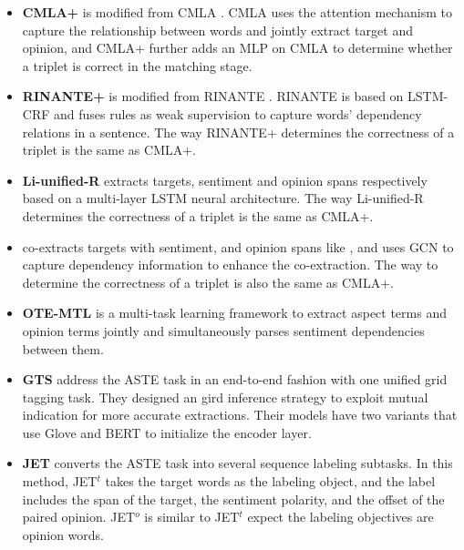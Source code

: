 \documentclass[11pt]{article}
\begin{document}
\begin{itemize}

     \item \textbf{CMLA+} is modified from CMLA \cite{wang2017coupled}. 
     CMLA uses the attention mechanism to capture the relationship between words and jointly extract target and opinion, and CMLA+ further adds an MLP on CMLA to determine whether a triplet is correct in the matching stage.
     
     \item \textbf{RINANTE+} is modified from RINANTE \cite{dai2019neural}. RINANTE is based on LSTM-CRF and fuses rules as weak supervision to capture words' dependency relations in a sentence. The way RINANTE+ determines the correctness of a triplet is the same as CMLA+.
     
     \item \textbf{Li-unified-R}  \cite{li2019unified} extracts targets, sentiment and opinion spans respectively based on a multi-layer LSTM neural architecture. 
     The way Li-unified-R determines the correctness of a triplet is the same as CMLA+.
     
     \item {} co-extracts targets with sentiment, and opinion spans like \cite{li2019unified}, and uses GCN to capture dependency information to enhance the co-extraction. The way to determine the correctness of a triplet is also the same as CMLA+.
     
     \item \textbf{OTE-MTL} \cite{zhang2020multi} is a multi-task learning framework to extract aspect terms and opinion terms jointly and simultaneously parses sentiment dependencies between them. 
     
     \item \textbf{GTS} \cite{wu-etal-2020-grid} address the ASTE task in an end-to-end fashion with one unified grid tagging task. They designed an gird inference strategy to exploit mutual indication for more accurate extractions. Their models have two variants that use Glove and BERT to initialize the encoder layer.
     
     \item \textbf{JET} \cite{xu2020position} converts the ASTE task into several sequence labeling subtasks. 
     In this method, JET$^t$ takes the target words as the labeling object, and the label includes the span of the target, the sentiment polarity, and the offset of the paired opinion. JET$^o$ is similar to JET$^t$ expect the labeling objectives are opinion words.
     
\end{itemize}
\end{document}

